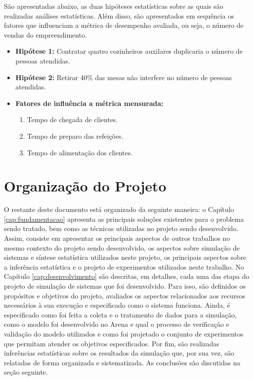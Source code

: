 \documentclass[pt,disc,oneside]{ufscpgeasthesis}
\begin{document}
			São apresentadas abaixo, as duas hipóteses estatísticas sobre as quais são realizadas análises estatísticas.
			Além disso, são apresentados em sequência os fatores que influenciam a métrica de desempenho avaliada, ou seja, o número de vendas do empreendimento.

			\begin{itemize}
				\item{\textbf{Hipótese 1:}} Contratar quatro cozinheiros auxilares duplicaria o número de pessoas atendidas.
				\item{\textbf{Hipótese 2:}} Retirar 40\% das mesas não interfere no número de pessoas atendidas.
				\item{\textbf{Fatores de influência a métrica mensurada:}}
				\begin{enumerate}
					\item Tempo de chegada de clientes.
					\item Tempo de preparo das refeições.
					\item Tempo de alimentação dos clientes.
				\end{enumerate}
			\end{itemize}

		\section{Organização do Projeto}
		\label{sec:organizacao}

			O restante deste documento está organizado da seguinte maneira: o Capítulo \ref{cap:fundamentacao} apresenta as principais soluções existentes para o problema sendo tratado, bem como as técnicas utilizadas no projeto sendo desenvolvido.
			Assim, consiste em apresentar os principais aspectos de outros trabalhos no mesmo contexto do projeto sendo desenvolvido, os aspectos sobre simulação de sistemas e síntese estatística utilizados neste projeto, os principais aspectos sobre a inferência estatística e o projeto de experimentos utilizados neste trabalho.
			No Capítulo \ref{cap:desenvolvimento} são descritas, em detalhes, cada uma das etapa do projeto de simulação de sistemas que foi desenvolvido.
			Para isso, são definidos os propósitos e objetivos do projeto, avaliados os aspectos relacionados aos recursos necessários à sua execução e especificado como o sistema funciona.
			Ainda, é especificado como foi feita a coleta e o tratamento de dados para a simulação, como o modelo foi desenvolvido no Arena e qual o processo de verificação e validação do modelo utilizados e como foi projetado o conjunto de experimentos que permitam atender os objetivos especificados.
			Por fim, são realizadas inferências estatísticas sobre os resultados da simulação que, por sua vez, são relatadas de forma organizada e sistematizada.
			As conclusões são discutidas na seção seguinte.
\end{document}

